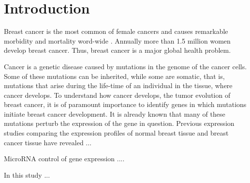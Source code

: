 
\section{Introduction}
\thispagestyle{empty}

Breast cancer is the most common of female cancers and causes remarkable
morbidity and mortality word-wide \citep{??}.  Annually more than 1.5 million
women develop breast cancer. Thus, breast cancer is a major global health
problem.

Cancer is a genetic disease caused by mutations in the genome of the cancer
cells. Some of these mutations can be inherited, while some are somatic, that
is, mutations that arise during the life-time of an individual in the tissue,
where cancer develops. To understand how cancer develops, the tumor evolution
of breast cancer, it is of paramount importance to identify genes in which
mutations initiate breast cancer development. It is already known that many of
these mutations perturb the expression of the gene in question. Previous
expression studies comparing the expression profiles of normal breast tissue
and breast cancer tissue have revealed ...

MicroRNA control of gene expression ....

In  this study ...

